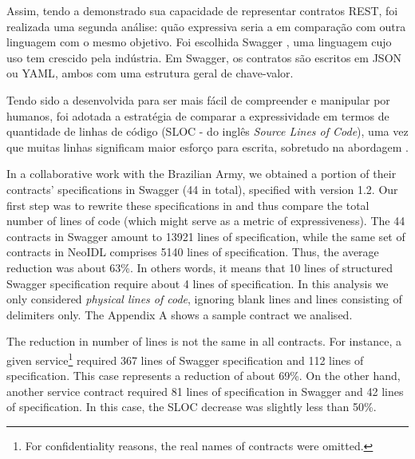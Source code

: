 Assim, tendo a \neoidl{} demonstrado sua capacidade de representar contratos
REST, foi realizada uma segunda análise: quão expressiva seria a \neoidl{}
em comparação com outra linguagem com o mesmo objetivo. Foi escolhida
Swagger \cite{swaggerSite}, uma linguagem cujo uso tem crescido pela indústria.
Em Swagger, os contratos são escritos em JSON\cite{JSon} ou YAML\cite{YAML},
ambos com uma estrutura geral de chave-valor.

Tendo sido a \neoidl{} desenvolvida para ser mais fácil de compreender e
manipular por humanos, foi adotada a estratégia de comparar a expressividade em
termos de quantidade de linhas de código (SLOC - do inglês \textit{Source Lines of Code}), uma vez que
muitas linhas significam maior esforço para escrita, sobretudo na abordagem
\CtFirst{}. 









In a collaborative work with the Brazilian Army,
we obtained a portion of their contracts' specifications in Swagger (44 in total), specified with version 1.2.
Our first step was to rewrite these specifications in \neoidl{} and thus compare the total
number of lines of code (which might serve as a metric of expressiveness).
The 44 contracts in Swagger amount to 13921 lines of specification, while the same set of contracts in NeoIDL comprises 5140 lines of specification. Thus, the average reduction was about 63\%. In others words, it means that 10 lines of structured Swagger specification require
about 4 lines of \neoidl{} specification. In this analysis we only considered \emph{physical lines of code}, ignoring 
blank lines and lines consisting of delimiters only. The Appendix A shows a sample contract we analised.

The reduction in number of lines is not the same in all contracts. For instance, a given service\footnote{For confidentiality reasons, the real names of contracts were omitted.} required 367 lines of Swagger specification and 112 lines of \neoidl{} specification. This case  
represents a reduction of about 69\%. On the other hand, another service contract required 
81 lines of specification in Swagger and 42 lines of \neoidl{} specification. In this case, the SLOC decrease was slightly less than 50\%.

